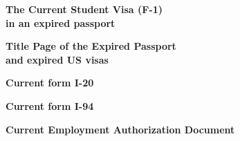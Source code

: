 \documentclass{article}
\begin{document}
 
% 

\vspace*{\fill}
\begin{center}

{\LARGE \bf
The Current Student Visa (F-1)\\
in an expired passport
}

\end{center}
\vspace*{\fill}


% 

\vspace*{\fill}
\begin{center}

{\LARGE \bf
Title Page of the Expired Passport\\
and expired US visas
}

\end{center}
\vspace*{\fill}


% 

\vspace*{\fill}
\begin{center}

{\LARGE \bf
Current form I-20
}

\end{center}
\vspace*{\fill}


% 

\vspace*{\fill}
\begin{center}

{\LARGE \bf
Current form I-94
}

\end{center}
\vspace*{\fill}


% 

\vspace*{\fill}
\begin{center}

{\LARGE \bf
Current Employment Authorization Document
}

\end{center}
\vspace*{\fill}
\end{document}
